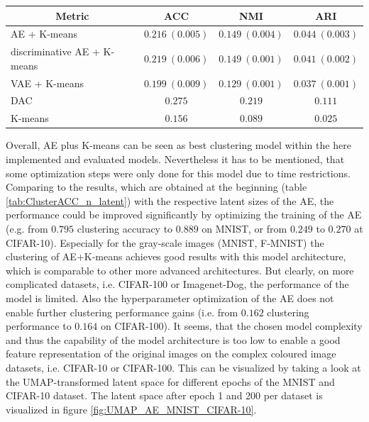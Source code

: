 \documentclass[12pt,DIV14,BCOR12mm,a4paper,footexclude,headinclude,halfparskip-,twoside,openright,cleardoubleempty,idxtotoc,bibtotoc,listtotoc,abstracton]{scrreprt} %
\numberwithin{equation}{chapter}
\begin{document}
\begin{table}[htb!]
\begin{tabular}{l|ccc}
        		\multicolumn{1}{c}{Metric} & ACC & NMI & ARI\\
        		\midrule
    			AE + K-means & $0.216\ (0.005)$ & $\mathbf{0.149}\ (0.004)$ & $\mathbf{0.044}\ (0.003)$\\
        		discriminative AE + K-means& $\mathbf{0.219}\ (0.006)$ & $\mathbf{0.149}\ (0.001)$ & $0.041\ (0.002)$\\
        		VAE + K-means & $0.199\ (0.009)$ & $0.129\ (0.001)$ & $0.037\ (0.001)$\\
        		DAC & $0.275$ & $0.219$ & $0.111$\\
        		K-means & $0.156$ & $0.089$ & $0.025$\\
        		\bottomrule
    		\end{tabular}
	\end{table}
	Overall, AE plus K-means can be seen as best clustering model within the here implemented and evaluated models. Nevertheless it has to be mentioned, that some optimization steps were only done for this model due to time restrictions. Comparing to the results, which are obtained at the beginning (table \ref{tab:ClusterACC_n_latent}) with the respective latent sizes of the AE, the performance could be improved significantly by optimizing the training of the AE (e.g. from $0.795$ clustering accuracy to $0.889$ on MNIST, or from $0.249$ to $0.270$ at CIFAR-10). Especially for the gray-scale images (MNIST, F-MNIST) the clustering of AE+K-means achieves good results with this model architecture, which is comparable to other more advanced architectures. But clearly, on more complicated datasets, i.e. CIFAR-100 or Imagenet-Dog, the performance of the model is limited. Also the hyperparameter optimization of the AE does not enable further clustering performance gains (i.e. from $0.162$ clustering performance to $0.164$ on CIFAR-100). It seems, that the chosen model complexity and thus the capability of the model architecture is too low to enable a good feature representation of the original images on the complex coloured image datasets, i.e. CIFAR-10 or CIFAR-100. This can be visualized by taking a look at the UMAP-transformed latent space for different epochs of the MNIST and CIFAR-10 dataset. The latent space after epoch 1 and 200 per dataset is visualized in figure \ref{fig:UMAP_AE_MNIST_CIFAR-10}.
\end{document}

